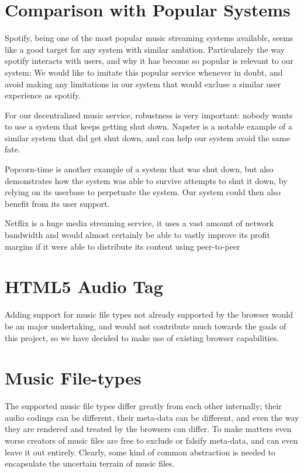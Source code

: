 \section{Comparison with Popular Systems}
Spotify, being one of the most popular music streaming systems available,
seems like a good target for any system with similar ambition.
Particularely the way spotify interacts with users,
and why it has become so popular is relevant to our system:
We would like to imitate this popular service whenever in doubt,
and avoid making any limitations in our system that would excluse a similar
user experience as spotify.

For our decentralized music service, robustness is very important:
nobody wants to use a system that keeps getting shut down.
Napster is a notable example of a similar system that did
get shut down, and can help our system avoid the same fate.

Popcorn-time is another example of a system that was shut down,
but also demonstrates how the system was able to survive
attempts to shut it down, by relying on its userbase to perpetuate the system.
Our system could then also benefit from its user support.

Netflix is a huge media streaming service,
it uses a vast amount of network bandwidth
and would almost certainly be able to vastly improve its profit margins
if it were able to distribute its content using peer-to-peer 

\section{HTML5 Audio Tag}
Adding support for music file types not already supported by the browser 
would be an major undertaking, 
and would not contribute much towards the goals of this project, 
so we have decided to make use of existing browser capabilities.

\section{Music File-types}
The supported music file types differ greatly from each other internally; 
their audio codings can be different, their meta-data can be different,
and even the way they are rendered and treated by the browsers can differ.
To make matters even worse creators of music files are free to exclude or falsify meta-data, 
and can even leave it out entirely.
Clearly, some kind of common abstraction is needed to encapsulate the uncertain terrain of music files.

